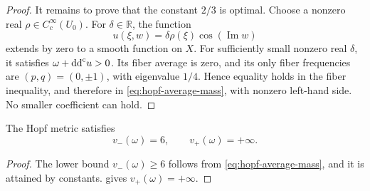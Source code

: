 \begin{proof}
It remains to prove that the constant $2/3$ is optimal. Choose a nonzero real $\rho\in C_c^\infty(U_0)$. For $\delta\in\mathbb R$, the function
\[
 u(\xi,w)=\delta\rho(\xi)\cos(\operatorname{Im}w)
\]
extends by zero to a smooth function on $X$. For sufficiently small nonzero real $\delta$, it satisfies $\omega+\mathrm{dd}^{\mathrm{c}} u>0$. Its fiber average is zero, and its only fiber frequencies are $(p,q)=(0,\pm1)$, with eigenvalue $1/4$. Hence equality holds in the fiber inequality, and therefore in \eqref{eq:hopf-average-mass}, with nonzero left-hand side. No smaller coefficient can hold.
\end{proof}

\begin{corollary}\label{cor:hopf-lower-mass}
The Hopf metric satisfies
\[
 v_-(\omega)=6,\qquad v_+(\omega)=+\infty.
\]
\end{corollary}
\begin{proof}
The lower bound $v_-(\omega)\geq6$ follows from \eqref{eq:hopf-average-mass}, and it is attained by constants.  gives $v_+(\omega)=+\infty$.
\end{proof}




